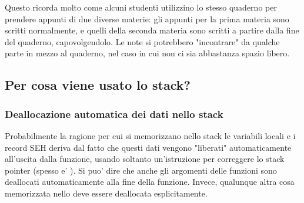 Questo ricorda molto come alcuni studenti utilizzino lo stesso quaderno per prendere appunti di due diverse materie:
gli appunti per la prima materia sono scritti normalmente, e quelli della seconda materia sono scritti a partire dalla fine del quaderno, capovolgendolo.
Le note si potrebbero "incontrare" da qualche parte in mezzo al quaderno, nel caso in cui non ci sia abbastanza spazio libero.


\subsection{Per cosa viene usato lo stack?}



\EN{}
\RU{}
\PTBR{}




\subsubsection{Deallocazione automatica dei dati nello stack}

Probabilmente la ragione per cui si memorizzano nello stack le variabili locali e i record SEH deriva dal fatto che questi dati vengono "liberati" automaticamente all'uscita dalla funzione,
usando soltanto un'istruzione per correggere lo stack pointer (spesso e' \ADD).
Si puo' dire che anche gli argomenti delle funzioni sono deallocati automaticamente alla fine della funzione.
Invece, qualunque altra cosa memorizzata nello  deve essere deallocata esplicitamente.

\EN{}
\RU{}
\PTBR{}


